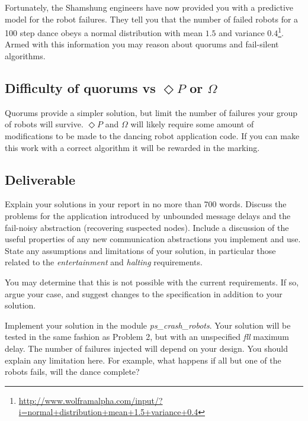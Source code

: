 \documentclass[a4paper]{article}
\begin{document}
Fortunately, the Shamshung engineers have now provided you with a predictive
model for the robot failures. They tell you that the number of failed robots
for a 100 step dance obeys a normal distribution with mean $1.5$ and variance
$0.4$\footnote{\url{http://www.wolframalpha.com/input/?i=normal+distribution+mean+1.5+variance+0.4}}.
Armed with this information you may reason about quorums and fail-silent
algorithms.



\subsection*{Difficulty of quorums vs $\Diamond P$ or $\Omega$} %
\label{sub:difficulty_of_quorums_vs_diamond_p_}

Quorums provide a simpler solution, but limit the number of failures your
group of robots will survive. $\Diamond P$ and $\Omega$ will likely require
some amount of modifications to be made to the dancing robot application code.
If you can make this work with a correct algorithm it will be rewarded in the
marking.



\subsection*{Deliverable} %
\label{sub:p3_deliverable}

Explain your solutions in your report in no more than 700 words.
Discuss the problems for the application introduced by unbounded message
delays and the fail-noisy abstraction (recovering suspected nodes).
Include a discussion of the useful properties of any new
communication abstractions you implement and use.
State any assumptions and limitations of your solution, in particular those
related to the \emph{entertainment} and \emph{halting} requirements.

You may determine that this is not possible with the
current requirements. If so, argue your case, and suggest changes to the
specification in addition to your solution.

Implement your solution in the module \emph{ps\_crash\_robots}.
Your solution will be tested in the same fashion as Problem 2, but with
an unspecified \emph{fll} maximum delay. The number of failures injected will
depend on your design. You should explain any limitation here. For example,
what happens if all but one of the robots fails, will the dance complete?
\end{document}
